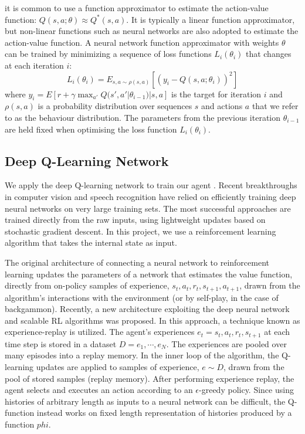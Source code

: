 \documentclass{acmsiggraph}
\begin{document}
it is common to use a function approximator to estimate the action-value function: $Q(s, a; \theta) \approx Q^{*}(s, a)$. It is typically a linear function approximator, but non-linear functions such as neural networks are also adopted to estimate the action-value function. A neural network function approximator with weights $\theta$ can be trained by minimizing a sequence of loss functions $L_i(\theta_i)$ that changes at each iteration $i$:
$$
L_i(\theta_i) = E_{s, a \sim \rho(s, a)} [(y_i - Q(s, a; \theta_i))^2]
$$
where $y_i = E[r + \gamma \max_{a'} Q(s', a' | \theta_{i-1}) | s, a] $ is the target for iteration $i$ and $\rho(s, a)$ is a probability distribution over sequences $s$ and actions $a$ that we refer to as the behaviour distribution. The parameters from the previous iteration $\theta_{i−1}$ are held fixed when optimising the loss function
$L_i(\theta_i)$.


\subsection{Deep Q-Learning Network}
We apply the deep Q-learning network to train our agent \cite{mnih2013playing}. Recent breakthroughs in computer vision and speech recognition have relied on efficiently training deep neural networks on very large training sets. The most successful approaches are trained directly from the raw inputs, using lightweight updates based on stochastic gradient descent. In this project, we use a reinforcement learning algorithm that takes the internal state as input.

The original architecture of connecting a neural network to reinforcement learning updates the parameters of a network that estimates the value function, directly from on-policy samples of experience, $s_t, a_t, r_t, s_{t+1}, a_{t+1}$, drawn from the algorithm’s interactions with the environment (or by self-play, in the case of backgammon). Recently, a new architecture exploiting the deep neural network and scalable RL algorithms was proposed. In this approach, a technique known as experience-replay is utilized. The agent's experiences $e_t={s_t, a_t, r_t, s_{t+1}}$ at each time step is stored in a dataset $D={e_1, \cdots, e_N}$. The experiences are pooled over many episodes into a replay memory. In the inner loop of the algorithm, the Q-learning updates are applied to samples of experience, $e \sim D$, drawn from the pool of stored samples (replay memory). After performing experience replay,
the agent selects and executes an action according to an $\epsilon$-greedy policy. Since using histories of arbitrary length as inputs to a neural network can be difficult, the Q-function instead works on fixed length representation of histories produced by a function $phi$. 
\end{document}
